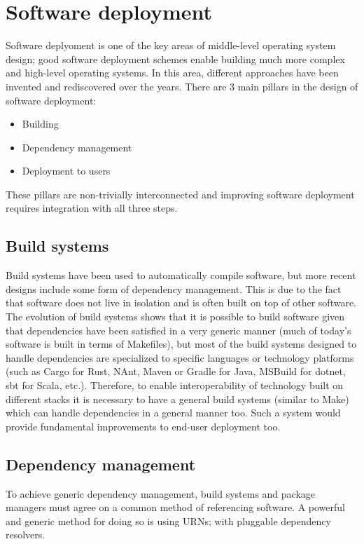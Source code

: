 	\section{Software deployment}
Software deplyoment is one of the key areas of middle-level operating system design; good software deployment schemes enable building much more complex and high-level operating systems. In this area, different approaches have been invented and rediscovered over the years. There are 3 main pillars in the design of software deployment:
\begin{itemize}
	\item Building
	\item Dependency management
	\item Deployment to users
\end{itemize}
These pillars are non-trivially interconnected and improving software deployment requires integration with all three steps.
\subsection{Build systems}
Build systems have been used to automatically compile software, but more recent designs include some form of dependency management. This is due to the fact that software does not live in isolation and is often built on top of other software. The evolution of build systems shows that it is possible to build software given that dependencies have been satisfied in a very generic manner (much of today's software is built in terms of Makefiles), but most of the build systems designed to handle dependencies are specialized to specific languages or technology platforms (such as Cargo for Rust, NAnt, Maven or Gradle for Java, MSBuild for dotnet, sbt for Scala, etc.). Therefore, to enable interoperability of technology built on different stacks it is necessary to have a general build systems (similar to Make) which can handle dependencies in a general manner too. Such a system would provide fundamental improvements to end-user deployment too.
\subsection{Dependency management}
To achieve generic dependency management, build systems and package managers must agree on a common method of referencing software. A powerful and generic method for doing so is using URNs; with pluggable dependency resolvers.\\
